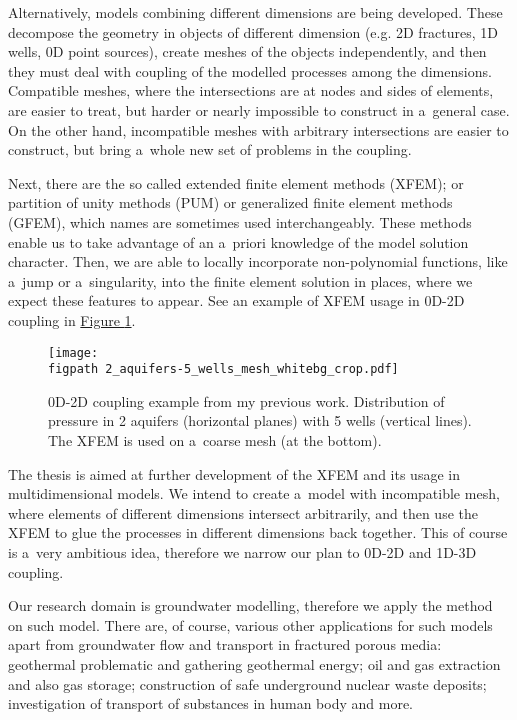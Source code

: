 \documentclass[FM,Dis]{tulthesis}
\newcommand{\fig}[1]{\hyperref[#1]{Figure \ref{#1}}}
\newcommand{\figpath}{figures/}
\begin{document}
Alternatively, models combining different dimensions are being developed. These decompose the geometry
in objects of different dimension (e.g. 2D fractures, 1D wells, 0D point sources), create meshes of the objects independently,
and then they must deal with coupling of the modelled processes among the dimensions. 
Compatible meshes, where the intersections are at nodes and sides of elements, are easier to treat, but harder
or nearly impossible to construct in a~general case. On the other hand, incompatible meshes with arbitrary intersections are easier to construct, 
but bring a~whole new set of problems in the coupling.

Next, there are the so called extended finite element methods (XFEM); or partition of unity methods (PUM) or generalized
finite element methods (GFEM), which names are sometimes used interchangeably. 
These methods enable us to take advantage of an a~priori knowledge of the model solution character.
Then, we are able to locally incorporate non-polynomial functions, like a~jump or a~singularity, into the finite element solution
 in places, where we expect these features to appear. See an example of XFEM usage in 0D-2D coupling in \fig{fig:aquifers}.
\begin{figure}[!htb]
  \centering    
    \texttt{[image: \\figpath 2\_aquifers-5\_wells\_mesh\_whitebg\_crop.pdf]}
  \caption{0D-2D coupling example from my previous work. Distribution of pressure in 2 aquifers (horizontal planes) with 5 wells 
          (vertical lines). The XFEM is used on a~coarse mesh (at the bottom). }
  \label{fig:aquifers}
\end{figure}

The thesis is aimed at further development of the XFEM and its usage in multidimensional models. 
We intend to create a~model with incompatible mesh, where elements of different dimensions intersect
arbitrarily, and then use the XFEM to glue the processes in different dimensions back together. 
This of course is a~very ambitious idea, therefore we narrow our plan to 0D-2D and 1D-3D coupling. 

Our research domain is groundwater modelling, therefore we apply the method on such model.
There are, of course, various other applications for such models apart from groundwater flow and transport in fractured porous media:
geothermal problematic and gathering geothermal energy; oil and gas extraction and also gas storage;
construction of safe underground nuclear waste deposits; investigation of transport of substances in human body
and more.
\end{document}
